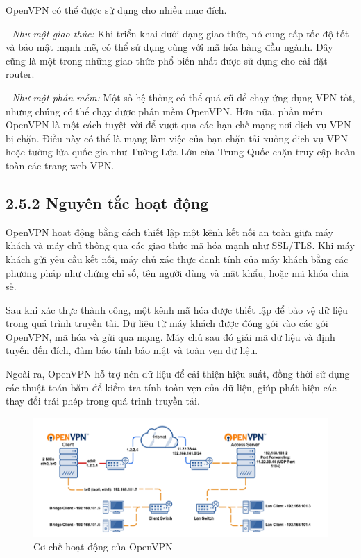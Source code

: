 OpenVPN có thể được sử dụng cho nhiều mục đích.

 - \textit{Như một giao thức:} Khi triển khai dưới dạng giao thức, nó cung cấp tốc độ tốt và bảo mật mạnh mẽ, có thể sử dụng cùng với mã hóa hàng đầu ngành. Đây cũng là một trong những giao thức phổ biến nhất được sử dụng cho cài đặt router.

 - \textit{Như một phần mềm:} Một số hệ thống có thể quá cũ để chạy ứng dụng VPN tốt, nhưng chúng có thể chạy được phần mềm OpenVPN. Hơn nữa, phần mềm OpenVPN là một cách tuyệt vời để vượt qua các hạn chế mạng nơi dịch vụ VPN bị chặn. Điều này có thể là mạng làm việc của bạn chặn tải xuống dịch vụ VPN hoặc tường lửa quốc gia như Tường Lửa Lớn của Trung Quốc chặn truy cập hoàn toàn các trang web VPN.
\subsection*{2.5.2 Nguyên tắc hoạt động}

OpenVPN hoạt động bằng cách thiết lập một kênh kết nối an toàn giữa máy khách và máy chủ thông qua các giao thức mã hóa mạnh như SSL/TLS. Khi máy khách gửi yêu cầu kết nối, máy chủ xác thực danh tính của máy khách bằng các phương pháp như chứng chỉ số, tên người dùng và mật khẩu, hoặc mã khóa chia sẻ.

Sau khi xác thực thành công, một kênh mã hóa được thiết lập để bảo vệ dữ liệu trong quá trình truyền tải. Dữ liệu từ máy khách được đóng gói vào các gói OpenVPN, mã hóa và gửi qua mạng. Máy chủ sau đó giải mã dữ liệu và định tuyến đến đích, đảm bảo tính bảo mật và toàn vẹn dữ liệu.

Ngoài ra, OpenVPN hỗ trợ nén dữ liệu để cải thiện hiệu suất, đồng thời sử dụng các thuật toán băm để kiểm tra tính toàn vẹn của dữ liệu, giúp phát hiện các thay đổi trái phép trong quá trình truyền tải.

\begin{figure}[htbp]
        \centering
        \includegraphics[width=0.8\linewidth]{img/openvpn.png}
        \caption{Cơ chế hoạt động của OpenVPN}
    \end{figure}
